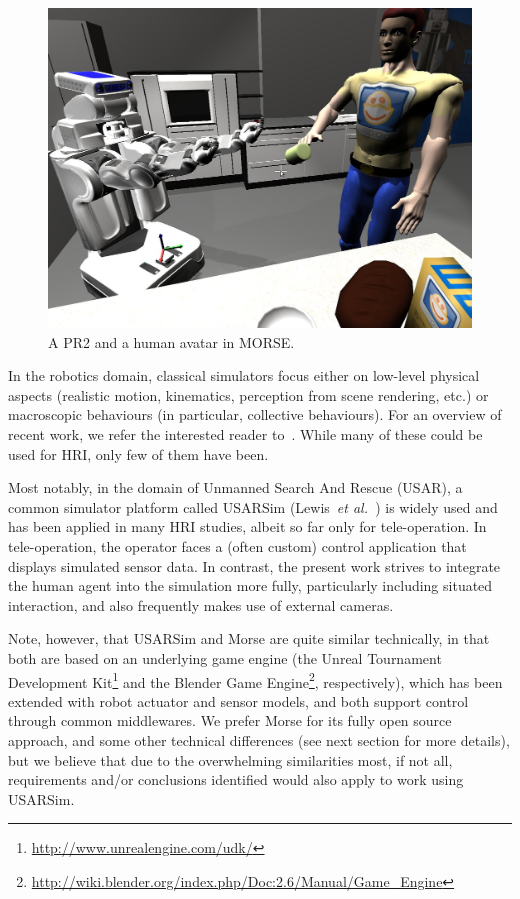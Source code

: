 \documentclass[conference]{IEEEtran}
\newcommand{\etal}{{\textit{et al.~}}}
\begin{document}
\begin{figure}[ht!]
      \centering 
      \includegraphics[width=0.9\linewidth]{morse_pr2.jpg}
      \caption{A PR2 and a human avatar in MORSE.}
      \label{fig|morse-hri}
\end{figure}

In the robotics domain, classical simulators focus either on low-level physical
aspects (realistic motion, kinematics, perception from scene rendering, etc.) 
or macroscopic behaviours (in particular, collective behaviours). For an overview
of recent work, we refer the interested reader to~\cite{Ando2010}. While many
of these could be used for HRI, only few of them have been.

Most notably, in the domain of Unmanned Search And Rescue (USAR), a common
simulator platform called USARSim (Lewis~\etal\cite{lewis2007usarsim}) is widely
used and has been applied in many HRI studies, albeit so far only for 
tele-operation. In tele-operation, the operator faces a (often custom) control 
application that displays simulated sensor data. In contrast, the present work
strives to integrate the human agent into the simulation more fully, 
particularly including situated interaction, and also frequently makes use of
external cameras.

Note, however, that USARSim and Morse are quite similar technically, in that
both are based on an underlying game engine (the Unreal Tournament Development
Kit\footnote{\url{http://www.unrealengine.com/udk/}} and the Blender Game Engine\footnote{\url{http://wiki.blender.org/index.php/Doc:2.6/Manual/Game_Engine}}, respectively), which has been extended 
with robot actuator and sensor models, and both support control through common
middlewares. We prefer Morse for its fully open source approach, and some
other technical differences (see next section for more details), but we believe
that due to the overwhelming similarities most, if not all, requirements and/or
conclusions identified would also apply to work using USARSim.
\end{document}
